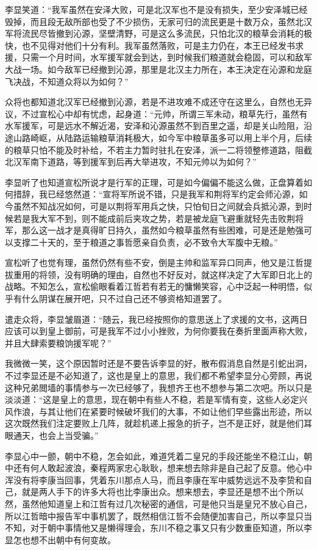 李显笑道：“我军虽然在安泽大败，可是北汉军也不是没有损失，至少安泽城已经毁掉，而且段无敌所部也受了不少损伤，无家可归的流民更是十数万众，虽然北汉军将流民尽皆撤到沁源，坚壁清野，可是这么多流民，只怕北汉的粮草会消耗的极快，也不见得对他们十分有利。我军虽然落败，可是主力仍在，本王已经发书求援，只需一个月时间，水军援军就会到达，到时候我们粮道就会稳固，可以和敌军大战一场。如今敌军已经撤到沁源，那里是北汉主力所在，本王决定在沁源和龙庭飞决战，不知道众将以为如何？”

众将也都知道北汉军已经撤到沁源，若是不进攻难不成还守在这里么，自然也无异议，不过宣松心中却有忧虑，起身道：“元帅，所谓三军未动，粮草先行，虽然有水军援军，可是远水不解近渴，安泽和沁源虽然不到百里之遥，却是关山险阻，沿途山路崎岖，从陆路运输粮草消耗极大，如今军中粮草虽多可以用上半个月，后续的粮草只怕不能及时补给，不若主力暂时驻扎在安泽，派一二将领整修道路，阻截北汉军南下道路，等到援军到后再大举进攻，不知元帅以为如何？”

李显听了也知道宣松所说才是行军的正理，可是如今偏偏不能这么做，正盘算着如何措辞，我已经悠然道：“宣将军所说不错，只是我军和荆将军约定会师沁源，如今虽然不知战况如何，可是以荆将军用兵之快，只怕旬日之间就会兵抵沁源，到时候若是我大军不到，则不能成前后夹攻之势，若是被龙庭飞避重就轻先击败荆将军，那么这一战才是真得旷日持久，虽然如今粮草虽然有些困难，可是还是勉强可以支撑二十天的，至于粮道之事哲愿亲自负责，必不致令大军腹中无粮。”

宣松听了也觉有理，虽然仍然有些不安，倒是主帅和监军异口同声，他又是江哲提拔重用的将领，没有明确的理由，自然也不好反对，就这样决定了大军即日北上的战略。不知怎么，宣松偷眼看着江哲若有若无的慵懒笑容，心中泛起一种明悟，似乎有什么阴谋在展开吧，只不过自己还不够资格知道罢了。

遣走众将，李显皱眉道：“随云，我已经按照你的意思送上了求援的文书，这两日应该可以到皇上御前，可是我军不过小小挫败，为何你要我在奏折里面声称大败，并且大肆索要粮饷援军呢？”

我微微一笑，这个原因暂时还是不要告诉李显的好，散布假消息自然是引蛇出洞，不过李显还是不必知道了，这也是皇上的意思，我们都不希望李显分心旁顾，再说这种兄弟閲墙的事情参与一次已经够了，我想齐王也不想参与第二次吧。所以只是淡淡道：“这是皇上的意思，现在朝中有些人不稳，若是军情有变，这些人必定兴风作浪，与其让他们在紧要时候破坏我们的大事，不如让他们早些露出形迹，所以这次既然我们注定要败上几阵，就趁机递上报急的折子，岂不是正好，就是他们耳眼通天，也会上当受骗。”

李显心中一颤，朝中不稳，怎会如此，难道凭着二皇兄的手段还能坐不稳江山，朝中还有何人敢起波浪，秦程两家忠心耿耿，想来想去除非是自己起了反意。他心中浑没有将李康当回事，凭着东川那点人马，而且李康在军中威势远远不及李贽和自己，就是两人手下的许多大将也比李康出众。想来想去，李显还是想不出个所以然，虽然他知道皇上和江哲有过几次秘密的通信，可是他只当是皇兄不放心自己，所以江哲暗中报告军中事机罢了，既然相信江哲不会随便加害自己，所以李显只当不知，对于朝中事情他又是懒得理会，东川不稳之事又只有少数重臣知道，所以李显怎也想不出朝中有何变故。

